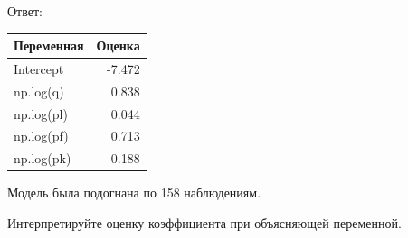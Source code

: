 \documentclass[
  russian,
]{article}
\newcounter{none} %
\begin{document}
Ответ:

{\def\LTcaptype{none} %
\begin{longtable}[]{@{}lr@{}}
\toprule\noalign{}
Переменная & Оценка \\
\midrule\noalign{}
\endhead
\bottomrule\noalign{}
\endlastfoot
Intercept & -7.472 \\
np.log(q) & 0.838 \\
np.log(pl) & 0.044 \\
np.log(pf) & 0.713 \\
np.log(pk) & 0.188 \\
\end{longtable}
}

Модель была подогнана по 158 наблюдениям.

Интерпретируйте оценку коэффициента при объясняющей переменной.
\end{document}
